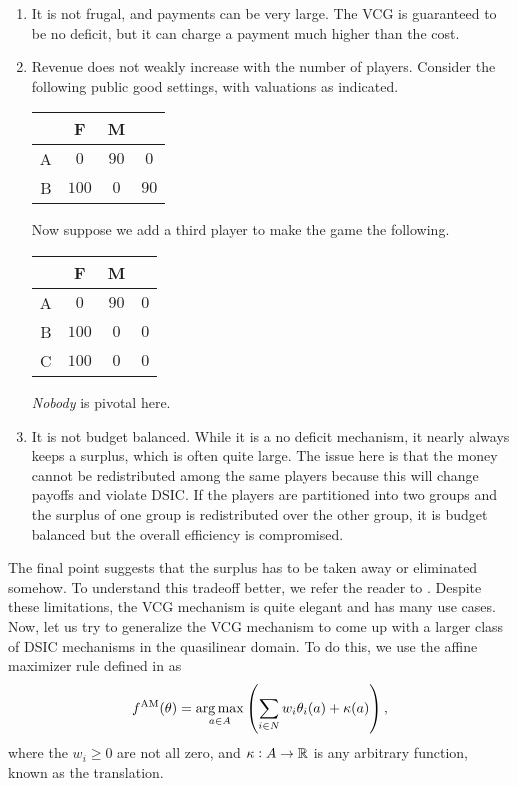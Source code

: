 \begin{enumerate}
			\item It is not frugal, and payments can be very large. The VCG is guaranteed to be no deficit, but it can charge a payment much higher than the cost.
			\item Revenue does not weakly increase with the number of players. Consider the following public good settings, with valuations as indicated.
			\begin{center}
			\begin{tabular}{|c||c|c||c|}
				\hline
				& F & M & \text{payment} \\
				\hline\hline
				A & $0$ & $90$ & $0$ \\
				\hline
				B & $100$ & $0$ & $90$ \\
				\hline
			\end{tabular}
			\end{center}
			Now suppose we add a third player to make the game the following.
			\begin{center}
			\begin{tabular}{|c||c|c||c|}
				\hline
				& F & M & \text{payment} \\
				\hline\hline
				A & $0$ & $90$ & $0$ \\
				\hline
				B & $100$ & $0$ & $0$ \\
				\hline
				C & $100$ & $0$ & $0$ \\ \hline
			\end{tabular}
			\end{center}
			\emph{Nobody} is pivotal here.

			 \item It is not budget balanced. While it is a no deficit mechanism, it nearly always keeps a surplus, which is often quite large. The issue here is that the money cannot be redistributed among the same players because this will change payoffs and violate DSIC. If the players are partitioned into two groups and the surplus of one group is redistributed over the other group, it is budget balanced but the overall efficiency is compromised. 
		\end{enumerate}

		The final point suggests that the surplus has to be taken away or eliminated somehow. To understand this tradeoff better, we refer the reader to \cite{nath-sandholm-2019}. Despite these limitations, the VCG mechanism is quite elegant and has many use cases.\\

		Now, let us try to generalize the VCG mechanism to come up with a larger class of DSIC mechanisms in the quasilinear domain. To do this, we use the affine maximizer rule defined in  as
		\[ f^{\text{AM}}(\theta) = \operatorname*{arg\,max}_{a \in A} \left( \sum_{i \in N} w_i \theta_i(a) + \kappa(a) \right), \]
		where the $w_i \ge 0$ are not all zero, and $\kappa : A \to \mathbb{R}$ is any arbitrary function, known as the translation.\\

